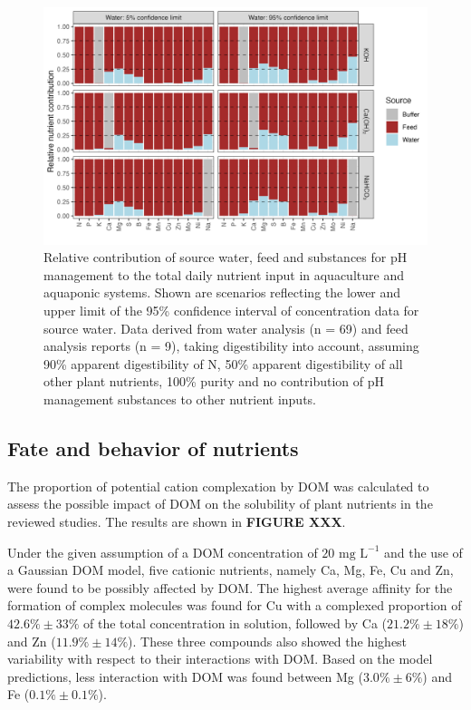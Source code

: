 \documentclass[
]{article}
\begin{document}
\begin{figure}
\centering
\includegraphics{plots/contribution_sources_digestincl.png}
\caption{Relative contribution of source water, feed and substances for pH management to the total daily nutrient input in aquaculture and aquaponic systems. Shown are scenarios reflecting the lower and upper limit of the 95\% confidence interval of concentration data for source water. Data derived from water analysis (n = 69) and feed analysis reports (n = 9), taking digestibility into account, assuming 90\% apparent digestibility of N, 50\% apparent digestibility of all other plant nutrients, 100\% purity and no contribution of pH management substances to other nutrient inputs.}
\end{figure}

\hypertarget{fate-and-behavior-of-nutrients-1}{%
\subsection{Fate and behavior of nutrients}\label{fate-and-behavior-of-nutrients-1}}

The proportion of potential cation complexation by DOM was calculated to assess the possible impact of DOM on the solubility of plant nutrients in the reviewed studies. The results are shown in \textbf{FIGURE XXX}.

Under the given assumption of a DOM concentration of \(20 \text{ mg L}^{-1}\) and the use of a Gaussian DOM model, five cationic nutrients, namely Ca, Mg, Fe, Cu and Zn, were found to be possibly affected by DOM.
The highest average affinity for the formation of complex molecules was found for Cu with a complexed proportion of \(42.6\% \pm 33\%\) of the total concentration in solution, followed by Ca (\(21.2\% \pm 18\%\)) and Zn (\(11.9\% \pm 14\%\)). These three compounds also showed the highest variability with respect to their interactions with DOM. Based on the model predictions, less interaction with DOM was found between Mg (\(3.0\% \pm 6\%\)) and Fe (\(0.1\% \pm 0.1\%\)).
\end{document}
